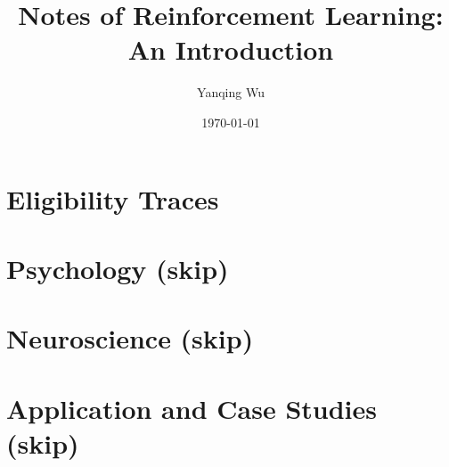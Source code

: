 \documentclass[lang=en,mode=geye,device=normal,color=blue,14pt]{elegantnote}
\title{Notes of Reinforcement Learning: An Introduction}
\author{Yanqing Wu}
\date{\today}
\DeclareMathOperator*{\1}{\mathbbm{1}}
\begin{document}
\maketitle

\setlength{\parindent}{0pt}
\tableofcontents
































\newpage
\section{Eligibility Traces}




\newpage
\section{Psychology (skip)}
\section{Neuroscience (skip)}
\section{Application and Case Studies (skip)}












\end{document}
